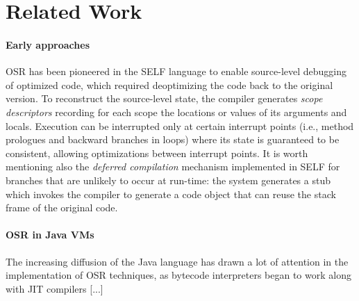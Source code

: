 \section{Related Work}
\label{se:related}

\paragraph{Early approaches}
OSR has been pioneered in the SELF language\cite{holzle1992self} to enable source-level debugging of optimized code, which required deoptimizing the code back to the original version. To reconstruct the source-level state, the compiler generates {\em scope descriptors} recording for each scope the locations or values of its arguments and locals. Execution can be interrupted only at certain interrupt points (i.e., method prologues and backward branches in loops) where its state is guaranteed to be consistent, allowing optimizations between interrupt points. It is worth mentioning also the {\em deferred compilation} mechanism\cite{chambers1991self} implemented in SELF for branches that are unlikely to occur at run-time: the system generates a stub which invokes the compiler to generate a code object that can reuse the stack frame of the original code.

\paragraph{OSR in Java VMs}
The increasing diffusion of the Java language has drawn a lot of attention in the implementation of OSR techniques, as bytecode interpreters began to work along with JIT compilers [...] 

\cite{fink2003design,detlefs2001method,soman2006efficient,lameed2013modular,steiner2007adaptive,chambers1992design}

  
  
  
  
  
  
  
  